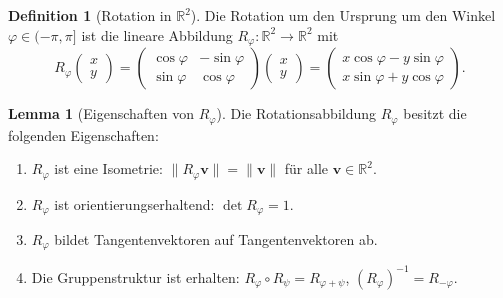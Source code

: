 ﻿\documentclass[12pt, a4paper]{article}
\theoremstyle{definition}
\newtheorem{definition}{Definition}[section]
\newtheorem{lemma}{Lemma}[section]
\begin{document}
	\begin{definition}[Rotation in $\mathbb{R}^2$]
		Die Rotation um den Ursprung um den Winkel $\varphi \in (-\pi, \pi]$ ist die
		lineare Abbildung $R_\varphi: \mathbb{R}^2 \to \mathbb{R}^2$ mit
		\[
		R_\varphi \begin{pmatrix} x \\ y \end{pmatrix}
		= \begin{pmatrix} \cos\varphi & -\sin\varphi \\ \sin\varphi & \cos\varphi \end{pmatrix}
		\begin{pmatrix} x \\ y \end{pmatrix}
		= \begin{pmatrix} x\cos\varphi - y\sin\varphi \\ x\sin\varphi + y\cos\varphi \end{pmatrix}.
		\]
	\end{definition}
	
	\begin{lemma}[Eigenschaften von $R_\varphi$]\label{lem:rotation}
		Die Rotationsabbildung $R_\varphi$ besitzt die folgenden Eigenschaften:
		\begin{enumerate}[label=(\roman*)]
			\item $R_\varphi$ ist eine Isometrie: $\|R_\varphi \mathbf{v}\| = \|\mathbf{v}\|$
			für alle $\mathbf{v} \in \mathbb{R}^2$.
			\item $R_\varphi$ ist orientierungserhaltend: $\det R_\varphi = 1$.
			\item $R_\varphi$ bildet Tangentenvektoren auf Tangentenvektoren ab.
			\item Die Gruppenstruktur ist erhalten: $R_\varphi \circ R_\psi = R_{\varphi+\psi}$,
			$(R_\varphi)^{-1} = R_{-\varphi}$.
		\end{enumerate}
	\end{lemma}
	
\end{document}
